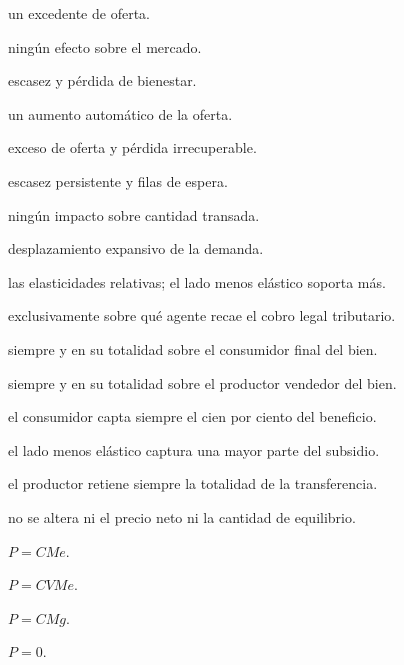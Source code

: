\begin{opts}
    \item un excedente de oferta.
    \item ningún efecto sobre el mercado.
    \item escasez y pérdida de bienestar.
    \item un aumento automático de la oferta.
\end{opts}

\begin{opts}
    \item exceso de oferta y pérdida irrecuperable.
    \item escasez persistente y filas de espera.
    \item ningún impacto sobre cantidad transada.
    \item desplazamiento expansivo de la demanda.
\end{opts}

\begin{opts}
    \item las elasticidades relativas; el lado menos elástico soporta más.
    \item exclusivamente sobre qué agente recae el cobro legal tributario.
    \item siempre y en su totalidad sobre el consumidor final del bien.
    \item siempre y en su totalidad sobre el productor vendedor del bien.
\end{opts}

\begin{opts}
    \item el consumidor capta siempre el cien por ciento del beneficio.
    \item el lado menos elástico captura una mayor parte del subsidio.
    \item el productor retiene siempre la totalidad de la transferencia.
    \item no se altera ni el precio neto ni la cantidad de equilibrio.
\end{opts}

\begin{opts}
    \item $P=CMe$.
    \item $P=CVMe$.
    \item $P=CMg$.
    \item $P=0$.
\end{opts}

